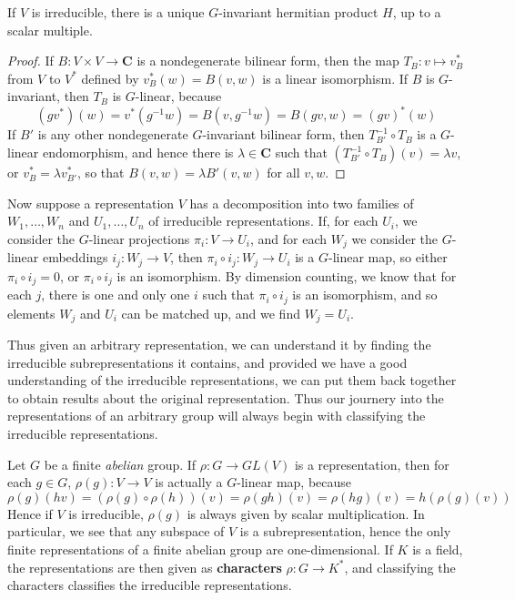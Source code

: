 \begin{corollary}
    If $V$ is irreducible, there is a unique $G$-invariant hermitian product $H$, up to a scalar multiple.
\end{corollary}
\begin{proof}
    If $B: V \times V \to \mathbf{C}$ is a nondegenerate bilinear form, then the map $T_B: v \mapsto v^*_B$ from $V$ to $V^*$ defined by $v^*_B(w) = B(v,w)$ is a linear isomorphism. If $B$ is $G$-invariant, then $T_B$ is $G$-linear, because
    \[ (gv^*)(w) = v^*(g^{-1}w) = B(v,g^{-1}w) = B(gv,w) = (gv)^*(w) \]
    If $B'$ is any other nondegenerate $G$-invariant bilinear form, then $T_{B'}^{-1} \circ T_B$ is a $G$-linear endomorphism, and hence there is $\lambda \in \mathbf{C}$ such that $(T_{B'}^{-1} \circ T_B)(v) = \lambda v$, or $v^*_B = \lambda v^*_{B'}$, so that $B(v,w) = \lambda B'(v,w)$ for all $v,w$.
\end{proof}

Now suppose a representation $V$ has a decomposition into two families of $W_1, \dots, W_n$ and $U_1, \dots, U_n$ of irreducible representations. If, for each $U_i$, we consider the $G$-linear projections $\pi_i: V \to U_i$, and for each $W_j$ we consider the $G$-linear embeddings $i_j: W_j \to V$, then $\pi_i \circ i_j: W_j \to U_i$ is a $G$-linear map, so either $\pi_i \circ i_j = 0$, or $\pi_i \circ i_j$ is an isomorphism. By dimension counting, we know that for each $j$, there is one and only one $i$ such that $\pi_i \circ i_j$ is an isomorphism, and so elements $W_j$ and $U_i$ can be matched up, and we find $W_j = U_i$.

Thus given an arbitrary representation, we can understand it by finding the irreducible subrepresentations it contains, and provided we have a good understanding of the irreducible representations, we can put them back together to obtain results about the original representation. Thus our journery into the representations of an arbitrary group will always begin with classifying the irreducible representations.

\begin{example}
    Let $G$ be a finite {\it abelian} group. If $\rho: G \to GL(V)$ is a representation, then for each $g \in G$, $\rho(g): V \to V$ is actually a $G$-linear map, because
    \[ \rho(g)(hv) = (\rho(g) \circ \rho(h))(v) = \rho(gh)(v) = \rho(hg)(v) = h(\rho(g)(v)) \]
    Hence if $V$ is irreducible, $\rho(g)$ is always given by scalar multiplication. In particular, we see that any subspace of $V$ is a subrepresentation, hence the only finite representations of a finite abelian group are one-dimensional. If $K$ is a field, the representations are then given as {\bf characters} $\rho: G \to K^*$, and classifying the characters classifies the irreducible representations.
\end{example}

